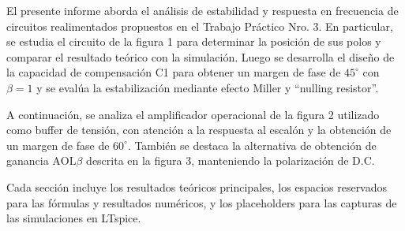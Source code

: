 El presente informe aborda el análisis de estabilidad y respuesta en frecuencia de circuitos realimentados propuestos en el Trabajo Práctico Nro. 3. En particular, se estudia el circuito de la figura 1 para determinar la posición de sus polos y comparar el resultado teórico con la simulación. Luego se desarrolla el diseño de la capacidad de compensación C1 para obtener un margen de fase de $45^\circ$ con $\beta=1$ y se evalúa la estabilización mediante efecto Miller y ``nulling resistor''.

A continuación, se analiza el amplificador operacional de la figura 2 utilizado como buffer de tensión, con atención a la respuesta al escalón y la obtención de un margen de fase de $60^\circ$. También se destaca la alternativa de obtención de ganancia $\text{AOL}\beta$ descrita en la figura 3, manteniendo la polarización de D.\@ C.

Cada sección incluye los resultados teóricos principales, los espacios reservados para las fórmulas y resultados numéricos, y los placeholders para las capturas de las simulaciones en LTspice.
